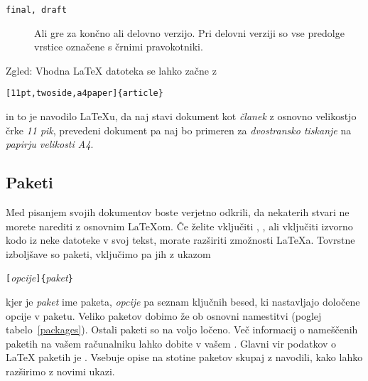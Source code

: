 \begin{table}[!bp]
\begin{lined}{12cm}
\begin{flushleft}
\begin{description}
\item[\normalfont\texttt{final, draft}] \quad Ali gre za končno ali delovno verzijo. Pri delovni verziji so
  vse predolge vrstice označene s črnimi pravokotniki.

\end{description}
\end{flushleft}
\end{lined}
\end{table}

Zgled: Vhodna \LaTeX{} datoteka se lahko začne z 
\begin{code}
\verb|[11pt,twoside,a4paper]{article}|
\end{code}
in to je navodilo \LaTeX{}u, da naj stavi dokument kot \emph{članek}
z osnovno velikostjo črke \emph{11 pik}, prevedeni dokument pa naj bo primeren za 
\emph{dvostransko tiskanje} na \emph{papirju velikosti A4}.
\pagebreak[2]

\subsection{Paketi}
 Med pisanjem svojih dokumentov boste verjetno odkrili, da nekaterih stvari ne morete
narediti z osnovnim \LaTeX{}om. Če želite vključiti , , ali
vključiti izvorno kodo iz neke datoteke v svoj tekst, morate razširiti 
zmožnosti \LaTeX{}a.  Tovrstne izboljšave so paketi, vključimo pa jih z ukazom
\begin{lscommand}
\verb|[|\emph{opcije}\verb|]{|\emph{paket}\verb|}|
\end{lscommand}
\noindent kjer je \emph{paket} ime paketa, 
\emph{opcije} pa seznam ključnih besed, ki nastavljajo določene opcije v paketu. 
Veliko paketov dobimo že ob osnovni namestitvi \LaTeXe{} (poglej tabelo~\ref{packages}). 
Ostali paketi so na voljo ločeno. Več informacij o nameščenih paketih na vašem računalniku
lahko dobite v vašem \guide. Glavni vir podatkov o \LaTeX{} paketih je \companion.
Vsebuje opise na stotine paketov skupaj z navodili, kako lahko razširimo \LaTeXe{} z novimi ukazi.

